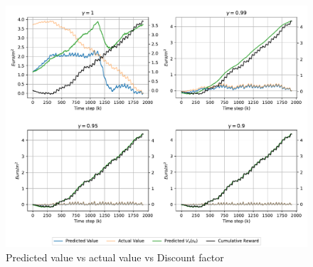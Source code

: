 \begin{figure}[H]
    \centering
    \includegraphics[width = \textwidth]{figures/vf_vs_gamma.pdf}
    \caption{Predicted value vs actual value vs Discount factor}
    \label{fig:vf-vs-gamma}
\end{figure}

